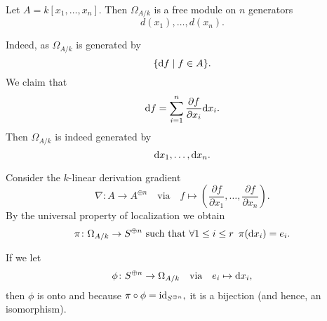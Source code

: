 \begin{example}
  Let $A = k[x_1, \dotsc, x_n]$. Then
  $\Omega_{A/{k}}$ is a free module on $n$ generators
  \[d(x_1), \dotsc, d(x_n).\]

  Indeed, as $\Omega_{A/{k}}$ is generated by
  \[ \{ \text{d} f \mathrel{|} f \in A\}.\]
  We claim that
  \[ \text{d} f = \sum_{i=1}^n \frac{\partial f}{\partial x_i} \text{d} x_i.\]
  Then $\Omega_{A /{k}}$ is indeed generated by
  \[ \text{d} x_1, \dotsc, \text{d} x_n.\]

  Consider the $k$-linear derivation gradient
  \[ \nabla \colon A \to A^{\oplus n} \quad \text{via} \quad f \mapsto ( \frac{\partial f}{\partial x_1}, \dotsc, \frac{\partial f}{\partial x_n}).\]
  By the universal property of localization we obtain
  \[ \pi \colon \Omega_{A /{k}} \to S^{\oplus n}\text{ such that } \forall 1 \leq i \leq r \enspace \pi(\text{d} x_i) = e_i.\]

  If we let
  \[ \phi \colon S^{\oplus n} \to \Omega_{A /{k}} \quad \text{via} \quad e_i \mapsto \text{d} x_i,\]
  then $\phi$ is onto and because $\pi \circ \phi = \text{id}_{S^{\oplus n}},$ it is a bijection (and hence, an isomorphism).
\end{example}



